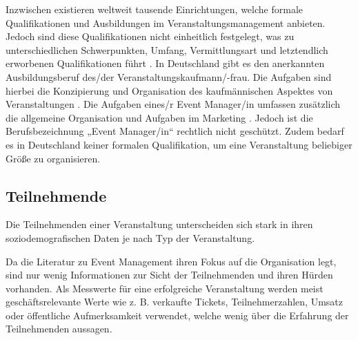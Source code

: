 



Inzwischen existieren weltweit tausende Einrichtungen, welche formale
Qualifikationen und Ausbildungen im Veranstaltungsmanagement anbieten. Jedoch
sind diese Qualifikationen nicht einheitlich festgelegt, was zu
unterschiedlichen Schwerpunkten, Umfang, Vermittlungsart und letztendlich
erworbenen Qualifikationen führt \cite{Bladen2017}. In Deutschland gibt es den
anerkannten Ausbildungsberuf des/der Veranstaltungs\-kaufmann/-frau. Die
Aufgaben sind hierbei die Konzipierung und Organisation des kaufmännischen
Aspektes von Veranstaltungen \cite{Kultusministerkonferenz2001}. Die Aufgaben
eines/r Event Manager/in umfassen zusätzlich die allgemeine Organisation und
Aufgaben im Marketing \cite{BundesagenturfurArbeit2021}. Jedoch ist die
Berufsbezeichnung „Event Manager/in“ rechtlich nicht geschützt. Zudem bedarf es
in Deutschland keiner formalen Qualifikation, um eine Veranstaltung beliebiger
Größe zu organisieren.

\subsection{Teilnehmende}

Die Teilnehmenden einer Veranstaltung unterscheiden sich stark in ihren
soziodemografischen Daten je nach Typ der Veranstaltung.

Da die Literatur zu Event Management ihren Fokus auf die Organisation legt, sind
nur wenig Informationen zur Sicht der Teilnehmenden und ihren Hürden vorhanden.
Als Messwerte für eine erfolgreiche Veranstaltung werden meist
geschäftsrelevante Werte wie z. B. verkaufte Tickets, Teilnehmerzahlen, Umsatz
oder öffentliche Aufmerksamkeit verwendet, welche wenig über die Erfahrung der
Teilnehmenden aussagen.




